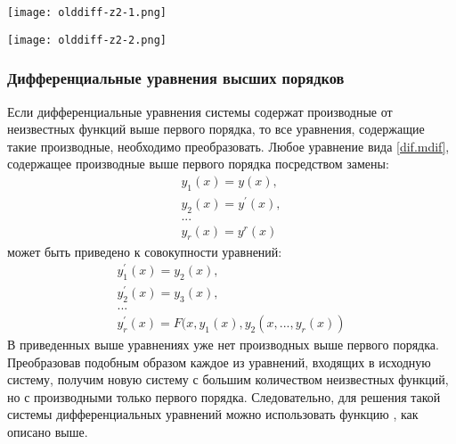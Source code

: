 
\begin{center}
	\texttt{[image: olddiff-z2-1.png]}
\end{center}

\begin{center}
	\texttt{[image: olddiff-z2-2.png]}
\end{center}

\subsubsection{Дифференциальные уравнения высших порядков}
Если дифференциальные уравнения системы содержат производные от неизвестных функций выше первого порядка, то все уравнения, содержащие такие производные, необходимо преобразовать. Любое уравнение вида \ref{dif.mdif}, содержащее производные выше первого порядка посредством замены:
\begin{equation}
	\begin{gathered}
		y_1(x)=y(x),\\ y_2(x)=y^{\prime}(x),\\  ... \\ y_r(x)=y^r(x)
	\end{gathered}
\end{equation}
может быть приведено к совокупности уравнений:
\begin{equation}
	\begin{gathered}
		y_1^{\prime}(x)=y_2(x), \\ y_2^{\prime}(x)=y_3(x), \\ ... \\ y_r^{\prime}(x)=F(x,y_1(x),y_2(x, ... , y_r(x))
	\end{gathered}
\end{equation}
В приведенных выше уравнениях уже нет производных выше первого порядка. Преобразовав подобным образом каждое из уравнений, входящих в исходную систему, получим новую систему с большим количеством неизвестных функций, но с производными только первого порядка. Следовательно, для решения такой системы дифференциальных уравнений можно использовать функцию , как описано выше.

